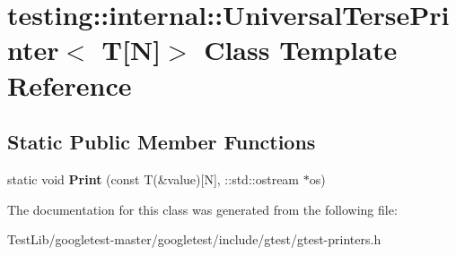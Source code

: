 \hypertarget{classtesting_1_1internal_1_1UniversalTersePrinter_3_01T[N]_4}{}\section{testing\+:\+:internal\+:\+:Universal\+Terse\+Printer$<$ T\mbox{[}N\mbox{]}$>$ Class Template Reference}
\label{classtesting_1_1internal_1_1UniversalTersePrinter_3_01T[N]_4}
\subsection*{Static Public Member Functions}
\begin{DoxyCompactItemize}
\item 
\mbox{\label{classtesting_1_1internal_1_1UniversalTersePrinter_3_01T[N]_4_a9e0ceb62fda7dc46ebcf5f911e459a49}} 
static void {\bfseries Print} (const T(\&value)\mbox{[}N\mbox{]}, \+::std\+::ostream $\ast$os)
\end{DoxyCompactItemize}


The documentation for this class was generated from the following file\+:\begin{DoxyCompactItemize}
\item 
Test\+Lib/googletest-\/master/googletest/include/gtest/gtest-\/printers.\+h\end{DoxyCompactItemize}
